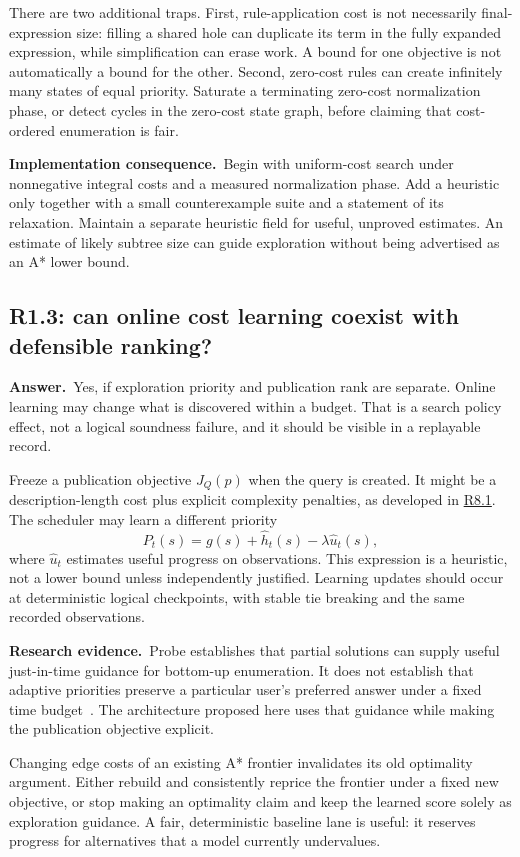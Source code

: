 \documentclass[11pt,a4paper]{article}
\theoremstyle{definition}
\theoremstyle{remark}
\newcommand{\ans}{\noindent\textbf{Answer.}\ }
\newcommand{\imp}{\par\noindent\textbf{Implementation consequence.}\ }
\newcommand{\lit}{\par\noindent\textbf{Research evidence.}\ }
\newcommand{\qref}[1]{\hyperref[q:#1]{#1}}
\begin{document}
There are two additional traps. First, rule-application cost is not necessarily
final-expression size: filling a shared hole can duplicate its term in the
fully expanded expression, while simplification can erase work. A bound for
one objective is not automatically a bound for the other. Second, zero-cost
rules can create infinitely many states of equal priority. Saturate a
terminating zero-cost normalization phase, or detect cycles in the zero-cost
state graph, before claiming that cost-ordered enumeration is fair.

\imp Begin with uniform-cost search under nonnegative integral costs and a
measured normalization phase. Add a heuristic only together with a small
counterexample suite and a statement of its relaxation. Maintain a separate
heuristic field for useful, unproved estimates. An estimate of likely subtree
size can guide exploration without being advertised as an A* lower bound.

\subsection{R1.3: can online cost learning coexist with defensible ranking?}\label{q:R1.3}
\ans Yes, if exploration priority and publication rank are separate. Online
learning may change what is discovered within a budget. That is a search
policy effect, not a logical soundness failure, and it should be visible in a
replayable record.

Freeze a publication objective $J_Q(p)$ when the query is created. It might be
a description-length cost plus explicit complexity penalties, as developed in
\qref{R8.1}. The scheduler may learn a different priority
\[
 P_t(s)=g(s)+\widehat h_t(s)-\lambda\widehat u_t(s),
\]
where $\widehat u_t$ estimates useful progress on observations. This expression
is a heuristic, not a lower bound unless independently justified. Learning
updates should occur at deterministic logical checkpoints, with stable tie
breaking and the same recorded observations.

\lit Probe establishes that partial solutions can supply useful just-in-time
guidance for bottom-up enumeration. It does not establish that adaptive
priorities preserve a particular user's preferred answer under a fixed time
budget~\cite{probe}. The architecture proposed here uses that guidance while
making the publication objective explicit.

Changing edge costs of an existing A* frontier invalidates its old optimality
argument. Either rebuild and consistently reprice the frontier under a fixed
new objective, or stop making an optimality claim and keep the learned score
solely as exploration guidance. A fair, deterministic baseline lane is useful:
it reserves progress for alternatives that a model currently undervalues.
\end{document}
